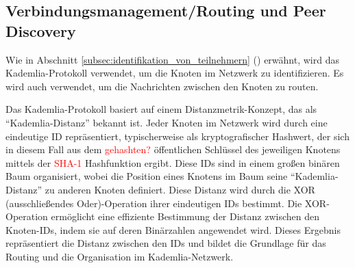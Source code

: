 \subsection{Verbindungsmanagement/Routing und Peer Discovery}
\label{subsec:routing}

Wie in Abschnitt \ref{subsec:identifikation_von_teilnehmern} 
() erwähnt,
wird das Kademlia-Protokoll verwendet, um die Knoten im Netzwerk zu identifizieren.
Es wird auch verwendet, um die Nachrichten zwischen den Knoten zu routen.




Das Kademlia-Protokoll basiert auf einem Distanzmetrik-Konzept, das als \\
\enquote{Kademlia-Distanz} bekannt ist. Jeder Knoten im Netzwerk wird durch eine eindeutige 
ID repräsentiert, typischerweise als kryptografischer Hashwert, der sich in diesem Fall 
aus dem \textcolor{red}{gehashten?} öffentlichen Schlüssel
des jeweiligen Knotens mittels der \textcolor{red}{SHA-1} Hashfunktion ergibt. Diese IDs 
sind in einem großen binären Baum organisiert, wobei die Position eines Knotens im Baum seine 
\enquote{Kademlia-Distanz} zu anderen Knoten definiert. Diese Distanz wird durch die XOR 
(ausschließendes Oder)-Operation ihrer eindeutigen IDs bestimmt. Die XOR-Operation 
ermöglicht eine effiziente Bestimmung der Distanz zwischen den Knoten-IDs, indem 
sie auf deren Binärzahlen angewendet wird. Dieses Ergebnis repräsentiert die 
Distanz zwischen den IDs und bildet die Grundlage für das Routing und die 
Organisation im Kademlia-Netzwerk.

